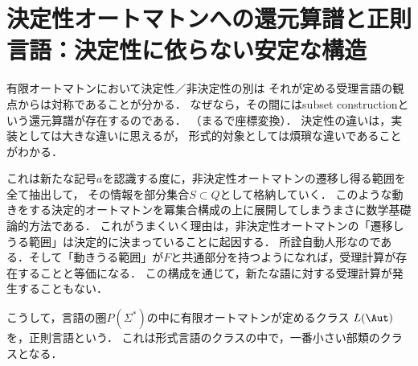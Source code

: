 \section{決定性オートマトンへの還元算譜と正則言語：決定性に依らない安定な構造}

\begin{tcolorbox}[colframe=ForestGreen, colback=ForestGreen!10!white, breakable,
    title=NFAとDFA]
    有限オートマトンにおいて決定性／非決定性の別は
    それが定める受理言語の観点からは対称であることが分かる．
    なぜなら，その間にはsubset constructionという還元算譜が存在するのである．
    （まるで座標変換）．
    決定性の違いは，実装としては大きな違いに思えるが，
    形式的対象としては煩瑣な違いであることがわかる．

    これは新たな記号$a$を認識する度に，非決定性オートマトンの遷移し得る範囲を全て抽出して，
    その情報を部分集合$S\subset Q$として格納していく．
    このような動きをする決定的オートマトンを冪集合構成の上に展開してしまうまさに数学基礎論的方法である．
    これがうまくいく理由は，非決定性オートマトンの「遷移しうる範囲」は決定的に決まっていることに起因する．
    所詮自動人形なのである．そして「動きうる範囲」が$F$と共通部分を持つようになれば，受理計算が存在することと等価になる．
    この構成を通じて，新たな語に対する受理計算が発生することもない．

    こうして，言語の圏$P(\Sigma^*)$の中に有限オートマトンが定めるクラス
    $L(\Aut)$を，正則言語という．
    これは形式言語のクラスの中で，一番小さい部類のクラスとなる．
\end{tcolorbox}

